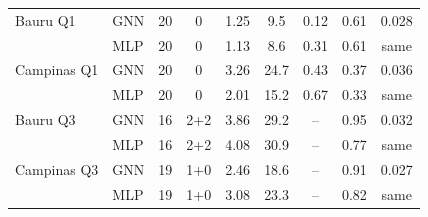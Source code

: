 \begin{table}[H]
\begin{tabular}{llccccccc}
\midrule
Bauru Q1 & GNN & 20 & 0 & 1.25 & 9.5 & 0.12 & 0.61 & 0.028 \\
 & MLP & 20 & 0 & 1.13 & 8.6 & 0.31 & 0.61 & same \\
\midrule
Campinas Q1 & GNN & 20 & 0 & 3.26 & 24.7 & 0.43 & 0.37 & 0.036 \\
 & MLP & 20 & 0 & 2.01 & 15.2 & 0.67 & 0.33 & same \\
\midrule
Bauru Q3 & GNN & 16 & 2+2 & 3.86 & 29.2 & -- & 0.95 & 0.032 \\
 & MLP & 16 & 2+2 & 4.08 & 30.9 & -- & 0.77 & same \\
\midrule
Campinas Q3 & GNN & 19 & 1+0 & 2.46 & 18.6 & -- & 0.91 & 0.027 \\
 & MLP & 19 & 1+0 & 3.08 & 23.3 & -- & 0.82 & same \\
\bottomrule
\end{tabular}
\end{table}
